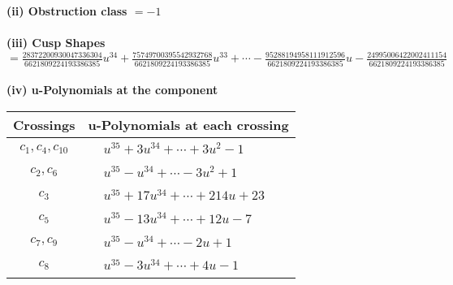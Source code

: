 \documentclass[1p]{elsarticle_modified}
\theoremstyle{definition}
\begin{document}
\flushleft \textbf{(ii) Obstruction class $= -1$}\\~\\
\flushleft \textbf{(iii) Cusp Shapes $= \frac{28372200930047336304}{6621809224193386385} u^{34}+\frac{75749700395542932768}{6621809224193386385} u^{33}+\cdots-\frac{95288194958111912596}{6621809224193386385} u-\frac{24995006422002411154}{6621809224193386385}$}\\~\\
\newpage\renewcommand{\arraystretch}{1}
\flushleft \textbf{(iv) u-Polynomials at the component}\newline \\
\begin{tabular}{m{50pt}|m{274pt}}
Crossings & \hspace{64pt}u-Polynomials at each crossing \\
\hline $$\begin{aligned}c_{1},c_{4},c_{10}\end{aligned}$$&$\begin{aligned}
&u^{35}+3 u^{34}+\cdots+3 u^2-1
\end{aligned}$\\
\hline $$\begin{aligned}c_{2},c_{6}\end{aligned}$$&$\begin{aligned}
&u^{35}- u^{34}+\cdots-3 u^2+1
\end{aligned}$\\
\hline $$\begin{aligned}c_{3}\end{aligned}$$&$\begin{aligned}
&u^{35}+17 u^{34}+\cdots+214 u+23
\end{aligned}$\\
\hline $$\begin{aligned}c_{5}\end{aligned}$$&$\begin{aligned}
&u^{35}-13 u^{34}+\cdots+12 u-7
\end{aligned}$\\
\hline $$\begin{aligned}c_{7},c_{9}\end{aligned}$$&$\begin{aligned}
&u^{35}- u^{34}+\cdots-2 u+1
\end{aligned}$\\
\hline $$\begin{aligned}c_{8}\end{aligned}$$&$\begin{aligned}
&u^{35}-3 u^{34}+\cdots+4 u-1
\end{aligned}$\\
\hline
\end{tabular}\\~\\
\end{document}
